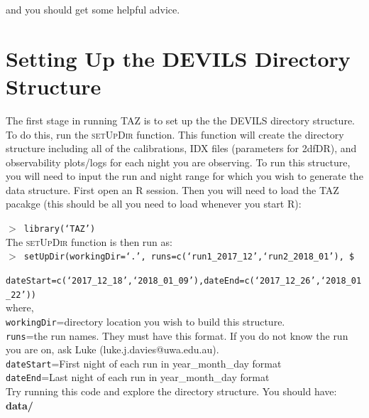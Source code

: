 \documentclass[12pt]{article}
\begin{document}
and you should get some helpful advice.

\section{Setting Up the DEVILS Directory Structure}

The first stage in running \textsc{TAZ} is to set up the the DEVILS directory structure. To do this, run the \textsc{setUpDir} function. This function will create the directory structure including all of the calibrations, IDX files (parameters for 2dfDR), and observability plots/logs for each night you are observing.  To run this structure, you will need to input the run and night range for which you wish to generate the data structure. First open an R session. Then you will need to load the \textsc{TAZ} pacakge (this should be all you need to load whenever you start R):

\hspace{10mm}  \texttt{$>$ library(`TAZ')}\\

The \textsc{setUpDir}  function is then run as:\\

\hspace{10mm}  \texttt{$>$ setUpDir(workingDir=`.', runs=c(`run1\_2017\_12',`run2\_2018\_01'), \$}

\hspace{20mm}   \texttt{dateStart=c(`2017\_12\_18',`2018\_01\_09'),dateEnd=c(`2017\_12\_26',`2018\_01\_22'))}\\

where, \\

 \texttt{workingDir}=directory location you wish to build this structure.\\
 \texttt{runs}=the run names. They must have this format. If you do not know the run you are on, ask Luke (luke.j.davies@uwa.edu.au).\\
 \texttt{dateStart}=First night of each run in year\_month\_day format\\
 \texttt{dateEnd}=Last night of each run in year\_month\_day format\\

Try running this code and explore the directory structure. You should have:\\

\hspace{5mm} \textbf{data/} 
\vspace{1mm}
\end{document}
